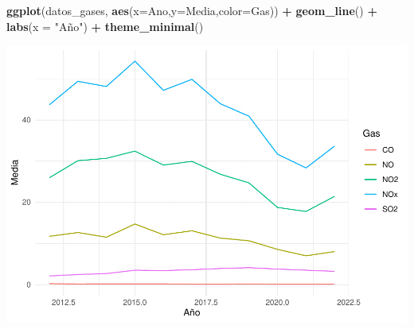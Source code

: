 \documentclass[notspecified,article,submit,moreauthors,pdftex]{Definitions/mdpi}
\newenvironment{Shaded}{\begin{snugshade}}{\end{snugshade}}
\newcommand{\AttributeTok}[1]{\textcolor[rgb]{0.13,0.29,0.53}{#1}}
\newcommand{\FunctionTok}[1]{\textcolor[rgb]{0.13,0.29,0.53}{\textbf{#1}}}
\newcommand{\NormalTok}[1]{#1}
\newcommand{\SpecialCharTok}[1]{\textcolor[rgb]{0.81,0.36,0.00}{\textbf{#1}}}
\newcommand{\StringTok}[1]{\textcolor[rgb]{0.31,0.60,0.02}{#1}}
\begin{document}
\begin{Shaded}
\begin{Highlighting}[]
\FunctionTok{ggplot}\NormalTok{(datos\_gases, }\FunctionTok{aes}\NormalTok{(}\AttributeTok{x=}\NormalTok{Ano,}\AttributeTok{y=}\NormalTok{Media,}\AttributeTok{color=}\NormalTok{Gas)) }\SpecialCharTok{+} 
  \FunctionTok{geom\_line}\NormalTok{() }\SpecialCharTok{+}
  \FunctionTok{labs}\NormalTok{(}\AttributeTok{x =} \StringTok{"Año"}\NormalTok{) }\SpecialCharTok{+}
  \FunctionTok{theme\_minimal}\NormalTok{()}
\end{Highlighting}
\end{Shaded}

\includegraphics{ProyectoAED2023_plantilla_files/figure-latex/unnamed-chunk-32-1.pdf}


\vspace{6pt}










\end{document}
